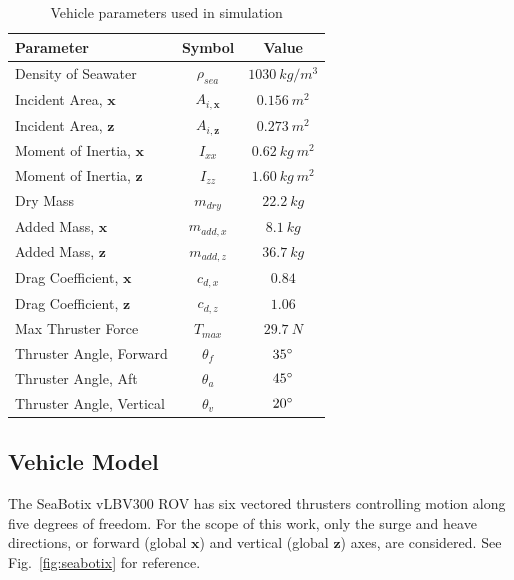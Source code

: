 \documentclass[letterpaper, 10 pt, conferences]{IEEEconf}  %
\renewcommand{\vec}[1]{\mathbf{#1}}
\begin{document}
\begin{table}
\caption{Vehicle parameters used in simulation}
\begin{center}
\def\arraystretch{1.2}%
\begin{tabular}{ |l|c|c| } 
 \hline 
 Parameter & Symbol & Value \\ 
 \hline
 Density of Seawater & $\rho_{sea}$ & $1030~kg/m^3$ \\ 
 Incident Area, $\vec{x}$ & $A_{i,\vec{x}}$ & $0.156~m^2$ \\ 
 Incident Area, $\vec{z}$ & $A_{i,\vec{z}}$ & $0.273~m^2$ \\
 Moment of Inertia, $\vec{x}$ & $I_{xx}$ & $0.62~kg~m^2$ \\
 Moment of Inertia, $\vec{z}$ & $I_{zz}$ & $1.60~kg~m^2$ \\
 Dry Mass & $m_{dry}$ & $22.2~kg$ \\
 Added Mass, $\vec{x}$ & $m_{add,x}$ & $8.1~kg$ \\
 Added Mass, $\vec{z}$ & $m_{add,z}$ & $36.7~kg$ \\
 Drag Coefficient, $\vec{x}$ & $c_{d,x}$ & $0.84$\\
 Drag Coefficient, $\vec{z}$ & $c_{d,z}$ & $1.06$\\
 Max Thruster Force & $T_{max}$ & $29.7~N$ \\
 Thruster Angle, Forward & $\theta_f$ & $35\degree$ \\
 Thruster Angle, Aft & $\theta_a$ & $45\degree$ \\
 Thruster Angle, Vertical & $\theta_v$ & $20\degree$ \\
 \hline
\end{tabular}
\end{center}
\label{table:vehicleData}
\end{table}

\subsection{Vehicle Model}

The SeaBotix vLBV300 ROV has six vectored thrusters controlling motion along five degrees of freedom. For the scope of this work, only the surge and heave directions, or forward (global $\vec{x}$) and vertical (global $\vec{z}$) axes, are considered. See Fig.~\ref{fig:seabotix} for reference. 
\end{document}
